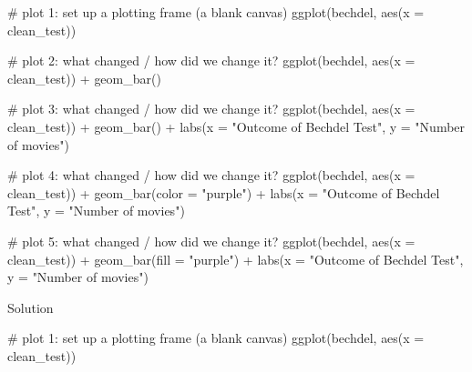 \documentclass[
  letterpaper,
  DIV=11,
  numbers=noendperiod]{scrreprt}
\newenvironment{Shaded}{\begin{snugshade}}{\end{snugshade}}
\newcommand{\AttributeTok}[1]{\textcolor[rgb]{0.40,0.45,0.13}{#1}}
\newcommand{\CommentTok}[1]{\textcolor[rgb]{0.37,0.37,0.37}{#1}}
\newcommand{\FunctionTok}[1]{\textcolor[rgb]{0.28,0.35,0.67}{#1}}
\newcommand{\NormalTok}[1]{\textcolor[rgb]{0.00,0.23,0.31}{#1}}
\newcommand{\SpecialCharTok}[1]{\textcolor[rgb]{0.37,0.37,0.37}{#1}}
\newcommand{\StringTok}[1]{\textcolor[rgb]{0.13,0.47,0.30}{#1}}
\begin{document}
\begin{Shaded}
\begin{Highlighting}[]
\CommentTok{\# plot 1: set up a plotting frame (a blank canvas)}
\FunctionTok{ggplot}\NormalTok{(bechdel, }\FunctionTok{aes}\NormalTok{(}\AttributeTok{x =}\NormalTok{ clean\_test))}

\CommentTok{\# plot 2: what changed / how did we change it?}
\FunctionTok{ggplot}\NormalTok{(bechdel, }\FunctionTok{aes}\NormalTok{(}\AttributeTok{x =}\NormalTok{ clean\_test)) }\SpecialCharTok{+}
\FunctionTok{geom\_bar}\NormalTok{()}

\CommentTok{\# plot 3: what changed / how did we change it?}
\FunctionTok{ggplot}\NormalTok{(bechdel, }\FunctionTok{aes}\NormalTok{(}\AttributeTok{x =}\NormalTok{ clean\_test)) }\SpecialCharTok{+}
\FunctionTok{geom\_bar}\NormalTok{() }\SpecialCharTok{+}
\FunctionTok{labs}\NormalTok{(}\AttributeTok{x =} \StringTok{"Outcome of Bechdel Test"}\NormalTok{, }\AttributeTok{y =} \StringTok{"Number of movies"}\NormalTok{)}

\CommentTok{\# plot 4: what changed / how did we change it?}
\FunctionTok{ggplot}\NormalTok{(bechdel, }\FunctionTok{aes}\NormalTok{(}\AttributeTok{x =}\NormalTok{ clean\_test)) }\SpecialCharTok{+}
\FunctionTok{geom\_bar}\NormalTok{(}\AttributeTok{color =} \StringTok{"purple"}\NormalTok{) }\SpecialCharTok{+}
\FunctionTok{labs}\NormalTok{(}\AttributeTok{x =} \StringTok{"Outcome of Bechdel Test"}\NormalTok{, }\AttributeTok{y =} \StringTok{"Number of movies"}\NormalTok{)}

\CommentTok{\# plot 5: what changed / how did we change it?}
\FunctionTok{ggplot}\NormalTok{(bechdel, }\FunctionTok{aes}\NormalTok{(}\AttributeTok{x =}\NormalTok{ clean\_test)) }\SpecialCharTok{+}
\FunctionTok{geom\_bar}\NormalTok{(}\AttributeTok{fill =} \StringTok{"purple"}\NormalTok{) }\SpecialCharTok{+}
\FunctionTok{labs}\NormalTok{(}\AttributeTok{x =} \StringTok{"Outcome of Bechdel Test"}\NormalTok{, }\AttributeTok{y =} \StringTok{"Number of movies"}\NormalTok{)}
\end{Highlighting}
\end{Shaded}

Solution

\begin{Shaded}
\begin{Highlighting}[]
\CommentTok{\# plot 1: set up a plotting frame (a blank canvas)}
\FunctionTok{ggplot}\NormalTok{(bechdel, }\FunctionTok{aes}\NormalTok{(}\AttributeTok{x =}\NormalTok{ clean\_test))}
\end{Highlighting}
\end{Shaded}
\end{document}
